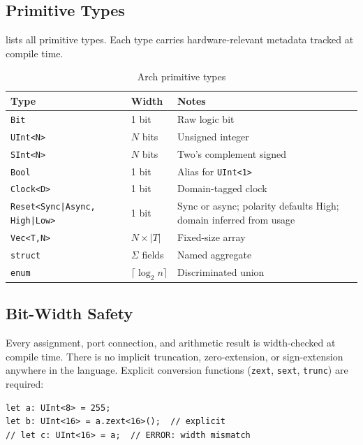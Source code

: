 \documentclass[11pt,twocolumn]{article}
\begin{document}
\subsection{Primitive Types}

 lists all primitive types. Each type carries hardware-relevant metadata tracked at compile time.

\begin{table}[t]
\centering
\caption{Arch primitive types}
\label{tab:types}
\footnotesize
\begin{tabular}{@{}llp{3.1cm}@{}}
\toprule
\textbf{Type} & \textbf{Width} & \textbf{Notes} \\
\midrule
\texttt{Bit}             & 1 bit & Raw logic bit \\
\texttt{UInt<N>}         & $N$ bits & Unsigned integer \\
\texttt{SInt<N>}         & $N$ bits & Two's complement signed \\
\texttt{Bool}            & 1 bit & Alias for \texttt{UInt<1>} \\
\texttt{Clock<D>}        & 1 bit & Domain-tagged clock \\
\texttt{Reset<Sync|Async, High|Low>} & 1 bit & Sync or async; polarity defaults High; domain inferred from usage \\
\texttt{Vec<T,N>}        & $N \times |T|$ & Fixed-size array \\
\texttt{struct}          & $\Sigma$ fields & Named aggregate \\
\texttt{enum}            & $\lceil\log_2 n\rceil$ & Discriminated union \\
\bottomrule
\end{tabular}
\end{table}

\subsection{Bit-Width Safety}

Every assignment, port connection, and arithmetic result is width-checked at compile time. There is no implicit truncation, zero-extension, or sign-extension anywhere in the language. Explicit conversion functions (\texttt{zext}, \texttt{sext}, \texttt{trunc}) are required:

\begin{lstlisting}[language=Arch,caption={Explicit width conversion},label={lst:width}]
let a: UInt<8> = 255;
let b: UInt<16> = a.zext<16>();  // explicit
// let c: UInt<16> = a;  // ERROR: width mismatch
\end{lstlisting}
\end{document}
